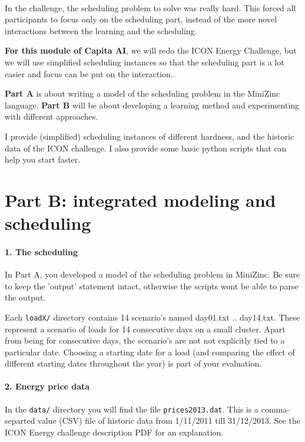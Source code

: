 \documentclass[a4,10pt]{article}
\begin{document}
\paragraph{}
In the challenge, the scheduling problem to solve was really hard. This forced all participants to focus only on the scheduling part, instead of the more novel interactions between the learning and the scheduling.

\textbf{For this module of Capita AI}, we will redo the ICON Energy Challenge, but we will use simplified scheduling instances so that the scheduling part is a lot easier and focus can be put on the interaction.

\textbf{Part A} is about writing a model of the scheduling problem in the MiniZinc language. \textbf{Part B} will be about developing a learning method and experimenting with different approaches.

I provide (simplified) scheduling instances of different hardness, and the historic data of the ICON challenge. I also provide some basic python scripts that can help you start faster.


\section{Part B: integrated modeling and scheduling}
\paragraph{1. The scheduling}
In Part A, you developed a model of the scheduling problem in MiniZinc. Be sure to keep the 'output' statement intact, otherwise the scripts wont be able to parse the output.

Each \texttt{loadX/} directory contains 14 scenario's named day01.txt .. day14.txt. These represent a scenario of loads for 14 consecutive days on a small cluster. Apart from being for consecutive days, the scenario's are not not explicitly tied to a particular date. Choosing a starting date for a load (and comparing the effect of different starting dates throughout the year) is part of your evaluation. 

\paragraph{2. Energy price data}
In the \texttt{data/} directory you will find the file \texttt{prices2013.dat}. This is a comma-separted value (CSV) file of historic data from 1/11/2011 till 31/12/2013. See the ICON Energy challenge description PDF for an explanation.
\end{document}
